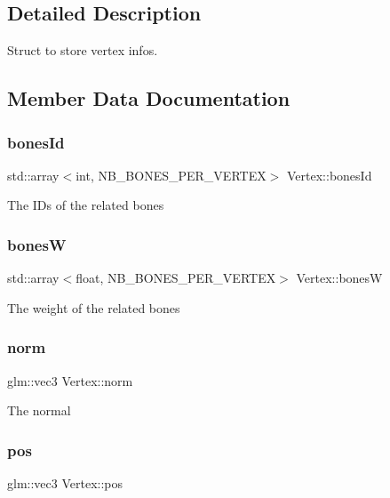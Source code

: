 \subsection{Detailed Description}
Struct to store vertex infos. 

\subsection{Member Data Documentation}
\mbox{\label{struct_vertex_a8a84e29c6a4f425c5034586c3c3d209b}} 
\subsubsection{\texorpdfstring{bones\+Id}{bonesId}}
{\footnotesize\ttfamily std\+::array$<$int, N\+B\+\_\+\+B\+O\+N\+E\+S\+\_\+\+P\+E\+R\+\_\+\+V\+E\+R\+T\+EX$>$ Vertex\+::bones\+Id}

The I\+Ds of the related bones \mbox{\label{struct_vertex_a00b57e82a00d4e139c25ed4ccb8cf757}} 
\subsubsection{\texorpdfstring{bonesW}{bonesW}}
{\footnotesize\ttfamily std\+::array$<$float, N\+B\+\_\+\+B\+O\+N\+E\+S\+\_\+\+P\+E\+R\+\_\+\+V\+E\+R\+T\+EX$>$ Vertex\+::bonesW}

The weight of the related bones \mbox{\label{struct_vertex_a70b394b12afe2e15e48535247716c160}} 
\subsubsection{\texorpdfstring{norm}{norm}}
{\footnotesize\ttfamily glm\+::vec3 Vertex\+::norm}

The normal \mbox{\label{struct_vertex_a858242dc7b40c034c5e13c589b30cfb4}} 
\subsubsection{\texorpdfstring{pos}{pos}}
{\footnotesize\ttfamily glm\+::vec3 Vertex\+::pos}

